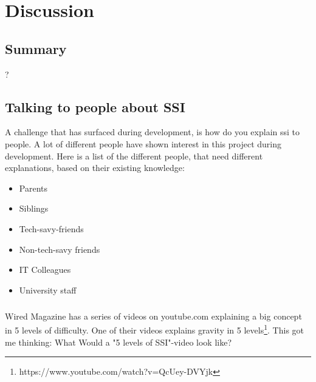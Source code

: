 \chapter{Discussion}

\section{Summary}

?

\section{Talking to people about SSI}

A challenge that has surfaced during development, is how do you explain \acrshort{ssi} to people. A lot of different people have shown interest in this project during development. Here is a list of the different people, that need different explanations, based on their existing knowledge:

\begin{itemize}
    \item Parents
    \item Siblings
    \item Tech-savy-friends
    \item Non-tech-savy friends
    \item IT Colleagues
    \item University staff
\end{itemize}

\paragraph{}
Wired Magazine has a series of videos on youtube.com explaining a big concept in 5 levels of difficulty. One of their videos explains gravity in 5 levels\footnote{https://www.youtube.com/watch?v=QcUey-DVYjk}. This got me thinking: What Would a "5 levels of SSI"-video look like?

